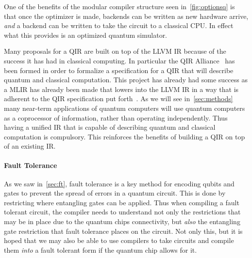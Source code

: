 One of the benefits of the modular compiler structure seen in~\cref{fig:optionsq} is that once the optimizer is made, backends can be written as new hardware arrive, \emph{and} a backend can be written to take the circuit to a classical \ac{CPU}.
In effect what this provides is an optimized quantum simulator.

Many proposals for a \ac{QIR} are built on top of the LLVM \ac{IR} because of the success it has had in classical computing.
In particular the QIR Alliance~\cite{qir} has been formed in order to formalize a specification for a \ac{QIR} that will describe quantum and classical computation.
This project has already had some success as a \ac{MLIR} has already been made that lowers into the LLVM \ac{IR} in a way that is adherent to the \ac{QIR} specification put forth~\cite{mlirquantum}.
As we will see in~\cref{sec:methods} many near-term applications of quantum computers will use quantum computers as a coprocessor of information, rather than operating independently.
Thus having a unified \ac{IR} that is capable of describing quantum and classical computation is compulsory.
This reinforces the benefits of building a \ac{QIR} on top of an existing \ac{IR}.


\paragraph{Fault Tolerance} %
As we saw in~\cref{sec:ft}, fault tolerance is a key method for encoding qubits and gates to prevent the spread of errors in a quantum circuit.
This is done by restricting where entangling gates can be applied.
Thus when compiling a fault tolerant circuit, the compiler needs to understand not only the restrictions that may be in place due to the quantum chips connectivity, but \emph{also} the entangling gate restriction that fault tolerance places on the circuit.
Not only this, but it is hoped that we may also be able to use compilers to take circuits and compile them \emph{into} a fault tolerant form if the quantum chip allows for it.

